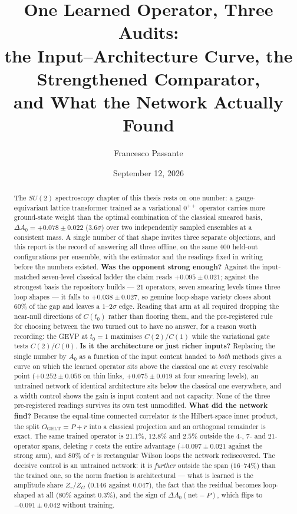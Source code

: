 \documentclass[11pt,a4paper]{article}
\title{One Learned Operator, Three Audits:\\
the Input--Architecture Curve, the Strengthened Comparator,\\
and What the Network Actually Found}
\author{Francesco Passante}
\date{September 12, 2026}
\newcommand{\Azero}{A_0}
\newcommand{\dAzero}{\Delta A_0}
\newcommand{\OG}{O_{\mathrm{GELT}}}
\begin{document}
\maketitle

\begin{abstract}
The $SU(2)$ spectroscopy chapter of this thesis rests on one number: a
gauge-equivariant lattice transformer trained as a variational $0^{++}$
operator carries more ground-state weight than the optimal combination of the
classical smeared basis, $\dAzero = +0.078 \pm 0.022$ ($3.6\sigma$) over two
independently sampled ensembles at a consistent mass. A single number of that
shape invites three separate objections, and this report is the record of
answering all three offline, on the same $400$ held-out configurations per
ensemble, with the estimator and the readings fixed in writing before the
numbers existed. \textbf{Was the opponent strong enough?} Against the
input-matched seven-level classical ladder the claim reads
$+0.095 \pm 0.021$; against the strongest basis the repository builds --- $21$
operators, seven smearing levels times three loop shapes --- it falls to
$+0.038 \pm 0.027$, so genuine loop-shape variety closes about $60\%$ of the
gap and leaves a $1$--$2\sigma$ edge. Reading that arm at all required dropping
the near-null directions of $C(t_0)$ rather than flooring them, and the
pre-registered rule for choosing between the two turned out to have no answer,
for a reason worth recording: the GEVP at $t_0=1$ maximises $C(2)/C(1)$ while
the variational gate tests $C(2)/C(0)$. \textbf{Is it the architecture or just
richer inputs?} Replacing the single number by $\Azero$ as a function of the
input content handed to \emph{both} methods gives a curve on which the learned
operator sits above the classical one at every resolvable point
($+0.252 \pm 0.056$ on thin links, $+0.075 \pm 0.019$ at four smearing levels),
an untrained network of identical architecture sits below the classical one
everywhere, and a width control shows the gain is input content and not
capacity. None of the three pre-registered readings survives its own test
unmodified. \textbf{What did the network find?} Because the equal-time
connected correlator \emph{is} the Hilbert-space inner product, the split
$\OG = P + r$ into a classical projection and an orthogonal remainder is exact.
The same trained operator is $21.1\%$, $12.8\%$ and $2.5\%$ outside the $4$-,
$7$- and $21$-operator spans, deleting $r$ costs the entire advantage
($+0.097 \pm 0.021$ against the strong arm), and $80\%$ of $r$ is rectangular
Wilson loops the network rediscovered. The decisive control is an untrained
network: it is \emph{further} outside the span ($16$--$74\%$) than the trained
one, so the norm fraction is architectural --- what is learned is the amplitude
share $Z_r/Z_G$ ($0.146$ against $0.047$), the fact that the residual becomes
loop-shaped at all ($80\%$ against $0.3\%$), and the sign of
$\dAzero(\text{net}-P)$, which flips to $-0.091 \pm 0.042$ without training.
\end{abstract}
\end{document}
